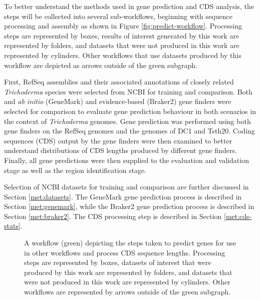To better understand the methods used in gene prediction and CDS
analysis, the steps will be collected into several sub-workflows,
beginning with sequence processing and assembly as shown in Figure
\ref{fig:predict-workflow}. Processing steps are represented by boxes,
results of interest generated by this work are represented by folders,
and datasets that were not produced in this work are represented by
cylinders. Other workflows that use datasets produced by this workflow
are depicted as arrows outside of the green subgraph.

First, RefSeq assemblies and their associated annotations of closely
related \textit{Trichoderma} species were selected from NCBI for
training and comparison. Both and \textit{ab initio} (GeneMark\cite{Borodovsky2011}) and
evidence-based (Braker2\cite{Bruna2021}) gene finders were selected
for comparison to evaluate gene prediction behaviour in both scenarios
in the context of \textit{Trichoderma} genomes. Gene prediction was
performed using both gene finders on the RefSeq genomes and the
genomes of DC1 and Tsth20. Coding sequences (CDS) output by the gene
finders were then examined to better understand distributions of CDS
lengths produced by different gene finders. Finally, all gene
predictions were then supplied to the evaluation and validation stage
as well as the region identification stage.

Selection of NCBI datasets for training and comparison are further
discussed in Section \ref{met:datasets}. The GeneMark gene prediction
process is described in Section \ref{met:genemark}, while the Braker2
gene prediction process is described in Section \ref{met:braker2}. The
CDS processing step is described in Section \ref{met:cds-stats}.

\begin{figure}
  \centering
  \caption{A workflow (green) depicting the steps taken to predict
    genes for use in other workflows and process CDS sequence
    lengths. Processing steps are represented by boxes, datasets of
    interest that were produced by this work are represented by
    folders, and datasets that were not produced in this work are
    represented by cylinders. Other workflows are represented by
    arrows outside of the green subgraph.}
\end{figure}

